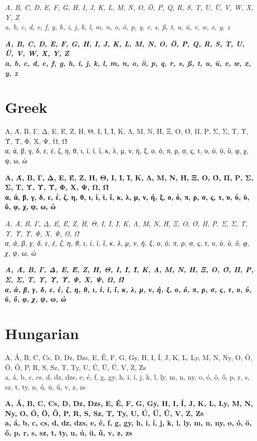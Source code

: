 \documentclass[12pt]{article}
\begin{document}
\textit{
A, B, C, D, E, F, G, H, I, J, K, L, M, N, O, Ö, P, Q, R, S, T, U, Ü, V, W, X, Y, Z \\
a, b, c, d, e, f, g, h, i, j, k, l, m, n, o, ö, p, q, r, s, ß, t, u, ü, v, w, x, y, z
}

\textbf{\textit{
A, B, C, D, E, F, G, H, I, J, K, L, M, N, O, Ö, P, Q, R, S, T, U, Ü, V, W, X, Y, Z \\
a, b, c, d, e, f, g, h, i, j, k, l, m, n, o, ö, p, q, r, s, ß, t, u, ü, v, w, x, y, z
}}


\section{Greek}
Α, Ά, Β, Γ, Δ, Ε, Έ, Ζ, Η, Θ, Ι, Ί, Ϊ, Κ, Λ, Μ, Ν, Ή, Ξ, Ο, Ό, Π, Ρ, Σ, Σ, Τ, Υ, Ύ, Ϋ, Φ, Χ, Ψ, Ω, Ώ \\
α, ά, β, γ, δ, ε, έ, ζ, η, θ, ι, ί, ϊ, ΐ, κ, λ, μ, ν, ή, ξ, ο, ό, π, ρ, σ, ς, τ, υ, ύ, ϋ, ΰ, φ, χ, ψ, ω, ώ

\textbf{
Α, Ά, Β, Γ, Δ, Ε, Έ, Ζ, Η, Θ, Ι, Ί, Ϊ, Κ, Λ, Μ, Ν, Ή, Ξ, Ο, Ό, Π, Ρ, Σ, Σ, Τ, Υ, Ύ, Ϋ, Φ, Χ, Ψ, Ω, Ώ \\
α, ά, β, γ, δ, ε, έ, ζ, η, θ, ι, ί, ϊ, ΐ, κ, λ, μ, ν, ή, ξ, ο, ό, π, ρ, σ, ς, τ, υ, ύ, ϋ, ΰ, φ, χ, ψ, ω, ώ
}

\textit{
Α, Ά, Β, Γ, Δ, Ε, Έ, Ζ, Η, Θ, Ι, Ί, Ϊ, Κ, Λ, Μ, Ν, Ή, Ξ, Ο, Ό, Π, Ρ, Σ, Σ, Τ, Υ, Ύ, Ϋ, Φ, Χ, Ψ, Ω, Ώ \\
α, ά, β, γ, δ, ε, έ, ζ, η, θ, ι, ί, ϊ, ΐ, κ, λ, μ, ν, ή, ξ, ο, ό, π, ρ, σ, ς, τ, υ, ύ, ϋ, ΰ, φ, χ, ψ, ω, ώ
}

\textbf{\textit{
Α, Ά, Β, Γ, Δ, Ε, Έ, Ζ, Η, Θ, Ι, Ί, Ϊ, Κ, Λ, Μ, Ν, Ή, Ξ, Ο, Ό, Π, Ρ, Σ, Σ, Τ, Υ, Ύ, Ϋ, Φ, Χ, Ψ, Ω, Ώ \\
α, ά, β, γ, δ, ε, έ, ζ, η, θ, ι, ί, ϊ, ΐ, κ, λ, μ, ν, ή, ξ, ο, ό, π, ρ, σ, ς, τ, υ, ύ, ϋ, ΰ, φ, χ, ψ, ω, ώ
}}


\clearpage
\section{Hungarian}
A, Á, B, C, Cs, D, Dz, Dzs, E, É, F, G, Gy, H, I, Í, J, K, L, Ly, M, N,
Ny, O, Ó, Ö, Ő, P, R, S, Sz, T, Ty, U, Ú, Ü, Ű, V, Z, Zs\\
a, á, b, c, cs, d, dz, dzs, e, é, f, g, gy, h, i, í, j, k, l, ly, m, n,
ny, o, ó, ö, ő, p, r, s, sz, t, ty, u, ú, ü, ű, v, z, zs

\textbf{
A, Á, B, C, Cs, D, Dz, Dzs, E, É, F, G, Gy, H, I, Í, J, K, L, Ly, M, N,
Ny, O, Ó, Ö, Ő, P, R, S, Sz, T, Ty, U, Ú, Ü, Ű, V, Z, Zs\\
a, á, b, c, cs, d, dz, dzs, e, é, f, g, gy, h, i, í, j, k, l, ly, m, n,
ny, o, ó, ö, ő, p, r, s, sz, t, ty, u, ú, ü, ű, v, z, zs
}
\end{document}
